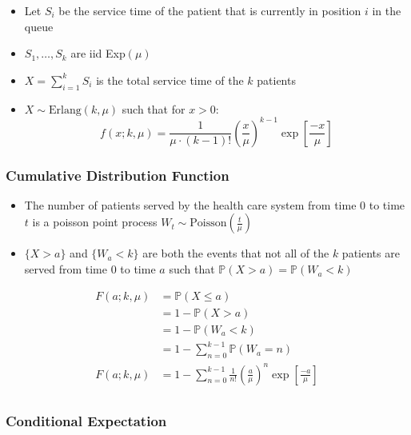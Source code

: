 \documentclass{article}
\begin{document}
\begin{itemize}
	\item Let $S_{i}$ be the service time of the patient that is currently in position $i$ in the queue
	\item $S_{1}, \ldots, S_{k}$ are iid Exp$(\mu)$
	\item $X = \sum_{i = 1}^{k} S_{i}$ is the total service time of the $k$ patients
	\item $X \sim \text{Erlang} (k, \mu)$ such that for $x > 0$:
		\begin{equation*}
			f (x; k, \mu) = \frac{1}{\mu \cdot (k - 1)!} \left( \frac{x}{\mu} \right)^{k - 1} \exp \left[ \frac{-x}{\mu} \right]
		\end{equation*}
\end{itemize}

\subsubsection{Cumulative Distribution Function}

\begin{itemize}
	\item The number of patients served by the health care system from time 0 to time $t$ is a poisson point process $W_{t} \sim \text{Poisson} \left( \frac{t}{\mu} \right)$
	\item $\{ X > a \}$ and $\{ W_{a} < k \}$ are both the events that not all of the $k$ patients are served from time 0 to time $a$ such that $\mathbb{P} (X > a) = \mathbb{P} (W_{a} < k)$
\end{itemize}

\begin{align*}
	F (a; k, \mu) & = \mathbb{P} (X \leq a) \\
	& = 1 - \mathbb{P} (X > a) \\
	& = 1 - \mathbb{P} (W_{a} < k) \\
	& = 1 - \sum_{n = 0}^{k - 1} \mathbb{P} (W_{a} = n) \\
	F (a; k, \mu) & = 1 - \sum_{n = 0}^{k - 1} \frac{1}{n!} \left( \frac{a}{\mu} \right)^{n} \exp \left[ \frac{-a}{\mu} \right] \\
\end{align*}

\subsubsection{Conditional Expectation}
\end{document}
